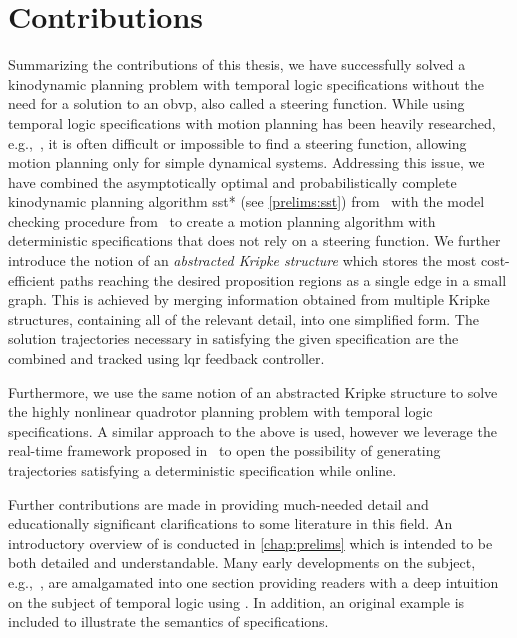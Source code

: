 \section{Contributions}

Summarizing the contributions of this thesis, we have successfully solved a kinodynamic planning problem with temporal logic specifications without the need for a solution to an \gls{obvp}, also called a steering function. While using temporal logic specifications with motion planning has been heavily researched, e.g.,~\cite{Ayala2013, Bhatia2010, Karaman2009,Lin2014, Wolff2014}, it is often difficult or impossible to find a steering function, allowing motion planning only for simple dynamical systems. Addressing this issue, we have combined the asymptotically optimal and probabilistically complete kinodynamic planning algorithm \gls{sst}* (see \autoref{prelims:sst}) from~\cite{Li2016} with the model checking procedure from~\cite{Karaman2009} to create a motion planning algorithm with deterministic \mucalc{} specifications that does not rely on a steering function. We further introduce the notion of an \emph{abstracted Kripke structure} which stores the most cost-efficient paths reaching the desired proposition regions as a single edge in a small graph. This is achieved by merging information obtained from multiple Kripke structures, containing all of the relevant detail, into one simplified form. The solution trajectories necessary in satisfying the given specification are the combined and tracked using \gls{lqr} feedback controller.

Furthermore, we use the same notion of an abstracted Kripke structure to solve the highly nonlinear quadrotor planning problem with temporal logic specifications. A similar approach to the above is used, however we leverage the real-time framework proposed in~\cite{Allen2016} to open the possibility of generating trajectories satisfying a deterministic \mucalc{} specification while online. 

Further contributions are made in providing much-needed detail and educationally significant clarifications to some literature in this field. An introductory overview of \mucalc{} is conducted in \autoref{chap:prelims} which is intended to be both detailed and understandable. Many early developments on the subject, e.g.,~\cite{Emerson1986,Emerson1991,Cleaveland1993,Emerson1999}, are amalgamated into one section providing readers with a deep intuition on the subject of temporal logic using \mucalc{}. In addition, an original example is included to illustrate the semantics of \mucalc{} specifications.

